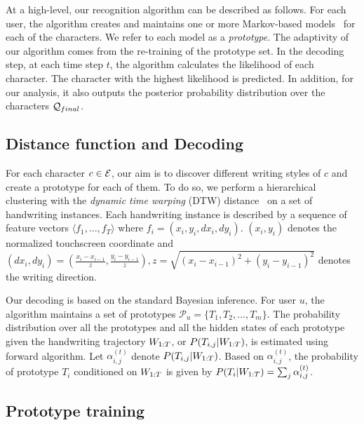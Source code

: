 \documentclass{sigchi}
\begin{document}
At a high-level, our recognition algorithm can be described as
follows. For each user, the algorithm creates and maintains one or
more Markov-based models~\cite{ThomasPloetz2011} for each of the
characters. We refer to each model as a {\em prototype}. The adaptivity
of our algorithm comes from the re-training of the prototype set. In
the decoding step, at each time step $t$, the algorithm calculates the
likelihood of each character. The character with the highest
likelihood is predicted. In addition, for our analysis, it also
outputs the posterior probability distribution over the characters
$\mathcal{Q}_{final}$.

\subsection{Distance function and Decoding}

\newcommand{\forwardprob}{\alpha^{(t)}_{i,j}}
\newcommand{\prototypeSet}{\mathcal{P}}

For each character $c \in \mathcal{E}$, our aim is to discover
different writing styles of $c$ and create a prototype for each of
them. To do so, we perform a hierarchical clustering with the {\it
  dynamic time warping} (DTW) distance~\cite{Rabiner1993} on a set of
handwriting instances. Each handwriting instance is described by a
sequence of feature vectors $\langle f_1, \ldots, f_T \rangle$ where
$f_i = (x_i,y_i, dx_i,dy_i)$.  $(x_i,y_i)$ denotes the normalized
touchscreen coordinate and $(dx_i,dy_i) = (\frac{x_i - x_{i-1}}{z},
\frac{y_i - y_{i-1}}{z}) , z = \sqrt{(x_i - x_{i-1})^2 + (y_i -
  y_{i-1})^2}$ denotes the writing direction.


Our decoding is based on the standard Bayesian inference.
For user $u$, the algorithm maintains a set of prototypes
$\prototypeSet_u = \{ T_1, T_2, ... , T_m\}$. The probability distribution over all
the prototypes and all the hidden states of each prototype given the
handwriting trajectory $W_{1:{T}}$, or $P(T_{i,j} |W_{1:{T}})$, is
estimated using forward algorithm. Let $\forwardprob$ denote $P(T_{i,j} |
W_{1:{T}})$. Based on $\forwardprob$, the probability of prototype
$T_i$ conditioned on $W_{1:{T}}$ is given by $P(T_i | \writing{T}) = \sum_{j}
\forwardprob$. 



\subsection{Prototype training}
\end{document}
